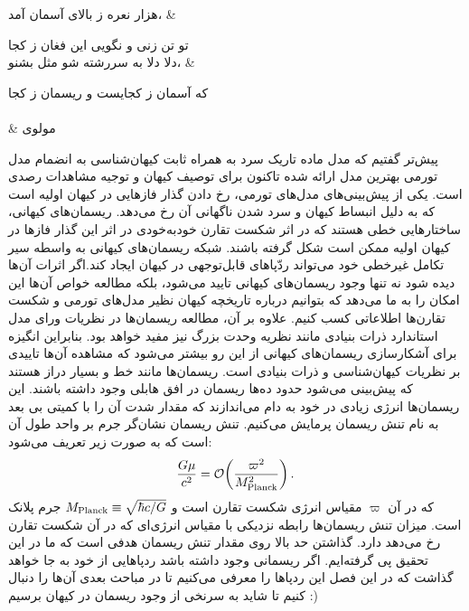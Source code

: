 \begin{center}
	\begin{minipage}{\textwidth}
		\begin{traditionalpoem}
			هزار نعره ز بالای آسمان آمد،		& 
			
			تو تن زنی و نگویی این فغان ز کجا \\
			
			دلا دلا به سررشته شو مثل بشنو،		&
			
			که آسمان ز کجایست و ریسمان ز کجا \\
			\\
			& 
			\hspace{45pt}
			مولوی
		\end{traditionalpoem}
	\end{minipage}
\end{center}

پیش‌تر گفتیم که مدل ماده تاریک سرد به همراه ثابت کیهان‌شناسی به انضمام مدل تورمی بهترین مدل ارائه شده تاکنون برای توصیف کیهان و توجیه مشاهدات رصدی
\cite{ade2016planck}
است. یکی از پیش‌بینی‌های مدل‌های تورمی، رخ دادن گذار فازهایی در کیهان اولیه است که به دلیل انبساط کیهان و سرد شدن ناگهانی آن رخ می‌دهد. ریسمان‌های کیهانی، ساختارهایی خطی هستند که در اثر شکست تقارن خودبه‌خودی در اثر این گذار فازها در کیهان اولیه ممکن است شکل گرفته باشند.
\cite{kibble1976topology ,kibble1980some ,hindmarsh1995cosmic, copeland2010cosmic}
شبکه ریسمان‌های کیهانی به واسطه سیر تکامل غیرخطی خود می‌تواند ردّپاهای قابل‌توجهی در کیهان ایجاد کند.اگر اثرات آن‌ها دیده شود نه تنها وجود ریسمان‌های کیهانی تایید می‌شود، بلکه مطالعه خواص آن‌ها این امکان را به ما می‌دهد که بتوانیم درباره تاریخچه کیهان نظیر مدل‌های تورمی و شکست تقارن‌ها اطلاعاتی کسب کنیم. علاوه بر آن، مطالعه ریسمان‌ها در نظریات ورای مدل استاندارد ذرات بنیادی مانند نظریه وحدت بزرگ
نیز مفید خواهد بود. بنابراین انگیزه برای آشکارسازی ریسمان‌های کیهانی از این رو بیشتر می‌شود که مشاهده آن‌ها تاییدی بر نظریات کیهان‌شناسی و ذرات بنیادی است.  
\cite{kuroyanagi2013forecast}
ریسمان‌ها مانند خط و بسیار دراز هستند که پیش‌بینی می‌شود حدود ده‌ها ریسمان در افق هابلی وجود داشته باشند. این ریسمان‌ها انرژی زیادی در خود به دام می‌اندازند که مقدار شدت آن را با کمیتی بی بعد به نام تنش ریسمان پرمایش می‌کنیم. تنش ریسمان نشان‌گر جرم بر واحد طول آن است که به صورت زیر تعریف می‌شود:
\begin{equation}
\frac{G\mu}{c^2}=\mathcal{O}\!\left(\frac{\varpi^2}{M_{\rm Planck}^2}\right).
\end{equation}
\label{eq:gmu}
که در آن
$\varpi$
مقیاس انرژی شکست تقارن است و 
$M_{\rm Planck}\equiv\sqrt{\hbar c/G}$
جرم پلانک است.
\cite{vafaei2017multiscale}
میزان تنش ریسمان‌ها رابطه نزدیکی با مقیاس انرژی‌ای که در آن شکست تقارن رخ می‌دهد دارد. گذاشتن حد بالا روی مقدار تنش ریسمان هدفی است که ما در این تحقیق پی گرفته‌ایم. اگر ریسمانی وجود داشته باشد ردپاهایی از خود به جا خواهد گذاشت که در این فصل این ردپاها را معرفی می‌کنیم تا در مباحث بعدی آن‌ها را دنبال کنیم تا شاید به سرنخی از وجود ریسمان در کیهان برسیم :)
 
